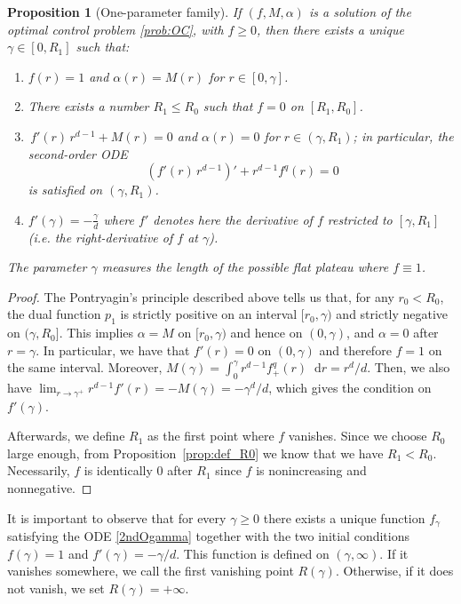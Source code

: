 \documentclass[11pt,a4paper]{article}
\numberwithin{equation}{section}
\theoremstyle{plain}
\newtheorem{proposition}[theorem]{Proposition}
\theoremstyle{remark}
\newcommand{\diff}{\mathop{}\!\mathrm{d}}
\begin{document}
\begin{proposition}[One-parameter family]\label{prop:family-gamma}
If $(f,M,\alpha)$ is a solution of the optimal control problem \ref{prob:OC}, with $f\geq 0$, then there exists a unique $\gamma\in[0,R_1]$ such that:
\begin{enumerate}
\item\label{item:flat-zone}
  $f(r)=1$ and $\alpha(r)=M(r)$ for $r\in[0,\gamma]$.
  \item There  exists a number $R_1\le R_0$ such that $f=0$ on $[R_1,R_0]$.
\item\label{item:ode-region}
  $\displaystyle \,f'(r)\,r^{d-1}+M(r)=0$
  and $\alpha(r)=0$ for $r\in(\gamma,R_1)$; in particular, the second-order ODE
  \begin{equation}
     \label{2ndOgamma}
   \,\left(f'(r)\,r^{d-1}\right)'+r^{d-1}f^q(r)=0   
  \end{equation}
  is satisfied on $(\gamma,R_1)$.
  \item  $f'(\gamma)=-\frac{\gamma}{d}$ where $f'$ denotes here the derivative of $f$ restricted to $[\gamma,R_1]$ (i.e. the right-derivative of $f$ at $\gamma$).
\end{enumerate}
The parameter $\gamma$ measures the length of the possible flat plateau where $f\equiv1$.
\end{proposition}

\begin{proof}
The Pontryagin's principle described above tells us that, for any $r_0<R_0$, the dual function $p_1$ is strictly positive on an interval $[r_0,\gamma)$ and strictly negative on $(\gamma,R_0]$. This implies $\alpha=M$ on $[r_0,\gamma)$ and hence on $(0,\gamma)$, and $\alpha=0$ after $r=\gamma$. In particular, we have that $f'(r)=0$ on  $(0,\gamma)$ and therefore $f=1$ on the same interval. Moreover, $M(\gamma)=\int_0^\gamma r^{d-1}f_+^q(r)\diff r= r^d/d$. Then, we also have  $\lim_{r\to\gamma^+} r^{d-1}f'(r)=-M(\gamma)=-\gamma^d/d$, which gives the condition on $f'(\gamma)$.  

Afterwards, we define $R_1$ as the first point where $f$ vanishes.
Since we choose $R_0$ large enough, from Proposition~\ref{prop:def_R0} we know that we have  $R_1<R_0$. 
Necessarily, $f$ is identically $0$ after $R_1$ since $f$ is nonincreasing and nonnegative.
\end{proof}

It is important to observe that for every $\gamma\geq 0$ there exists a unique function $f_\gamma$ satisfying the ODE \eqref{2ndOgamma} together with the two initial conditions $f(\gamma)=1$ and $f'(\gamma)=-\gamma/d$. This function is defined on $(\gamma,\infty)$. If it vanishes somewhere, we call the first vanishing point  $R(\gamma)$. Otherwise, if it does not vanish, we set $R(\gamma)=+\infty$.
\end{document}
